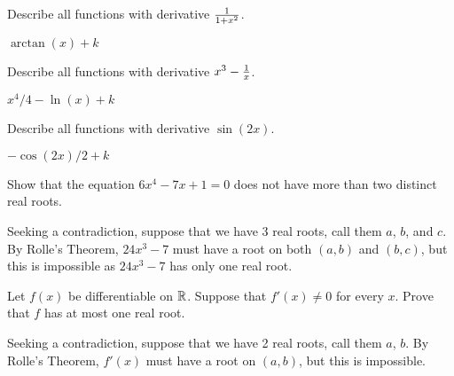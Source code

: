\begin{exercises}
\begin{exercise} Describe all functions with derivative ${1\over 1+x^2}$.
\begin{answer} $\arctan(x) + k$
\end{answer}\end{exercise}

\begin{exercise} Describe all functions with derivative $x^3-{1\over x}$.
\begin{answer} $x^4/4 -\ln(x) +k$
\end{answer}\end{exercise}


\begin{exercise} Describe all functions with derivative $\sin(2x)$.
\begin{answer} $-\cos(2x)/2 +k$
\end{answer}
\end{exercise}

\begin{exercise} Show that the equation $6x^4 -7x+1 =0$ does not have more
than two distinct real roots.
\begin{answer} 
Seeking a contradiction, suppose that we have 3 real roots, call them
$a$, $b$, and $c$. By Rolle's Theorem, $24x^3-7$ must have a root on
both $(a,b)$ and $(b,c)$, but this is impossible as $24x^3-7$ has only
one real root.
\end{answer}
\end{exercise}

\begin{exercise} Let $f(x)$ be differentiable on $\mathbb{R}$. Suppose that $f'(x) \neq
0$ for every $x$. Prove that $f$ has at most one real root.
\begin{answer} 
Seeking a contradiction, suppose that we have 2 real roots, call them
$a$, $b$. By Rolle's Theorem, $f'(x)$ must have a root on $(a,b)$, but
this is impossible.
\end{answer}
\end{exercise}
 


\end{exercises}

